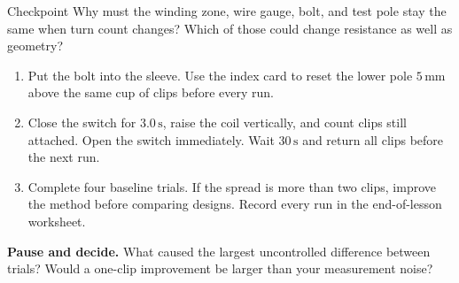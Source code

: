 \begin{telospanel}{Checkpoint}
Why must the winding zone, wire gauge, bolt, and test pole stay the same when
turn count changes? Which of those could change resistance as well as geometry?
\end{telospanel}

\begin{center}
\end{center}

\begin{enumerate}
\item Put the bolt into the sleeve. Use the index card to reset the lower pole
  \(5\,\mathrm{mm}\) above the same cup of clips before every run.
\item Close the switch for \(3.0\,\mathrm{s}\), raise the coil vertically, and
  count clips still attached. Open the switch immediately. Wait \(30\,\mathrm{s}\)
  and return all clips before the next run.
\item Complete four baseline trials. If the spread is more than two clips,
  improve the method before comparing designs. Record every run in the
  end-of-lesson worksheet.
\end{enumerate}

\noindent\textbf{Pause and decide.} What caused the largest uncontrolled
difference between trials? Would a one-clip improvement be larger than your
measurement noise?

